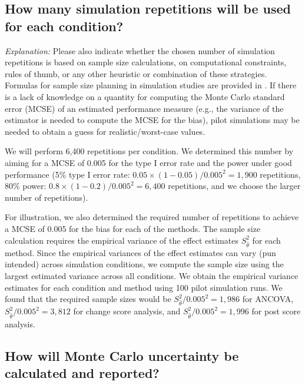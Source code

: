 \documentclass[12pt]{article}
\begin{document}
\subsection{How many simulation repetitions will be used for each condition?}

\textit{Explanation:} Please also indicate whether the chosen number of simulation repetitions is based on sample size calculations, on computational constraints, rules of thumb, or any other heuristic or combination of these strategies. Formulas for sample size planning in simulation studies are provided in \textcite{Siepe2023}. If there is a lack of knowledge on a quantity for computing the Monte Carlo standard error (MCSE) of an estimated performance measure (e.g., the variance of the estimator is needed to compute the MCSE for the bias), pilot simulations may be needed to obtain a guess for realistic/worst-case values.

\begin{examplebox}
We will perform 6,400 repetitions per condition. We determined this number by aiming for a MCSE of 0.005 for the type I error rate and the power under good performance (5\% type I error rate: $0.05 \times (1 - 0.05) / 0.005^2 = 1,900$ repetitions, 80\% power: $0.8 \times (1 - 0.2) / 0.005^2 = 6,400$ repetitions, and we choose the larger number of repetitions).

For illustration, we also determined the required number of repetitions to achieve a MCSE of 0.005 for the bias for each of the methods. The sample size calculation requires the empirical variance of the effect estimates $S_{\hat{\theta}}^2$ for each method. Since the empirical variances of the effect estimates can vary (pun intended) across simulation conditions, we compute the sample size using the largest estimated variance across all conditions. We obtain the empirical variance estimates for each condition and method using 100 pilot simulation runs. We found that the required sample sizes would be $S_{\hat{\theta}}^2/0.005^2 = 1{,}986$ for ANCOVA, $S_{\hat{\theta}}^2/0.005^2 = 3{,}812$ for change score analysis, and $S_{\hat{\theta}}^2/0.005^2 = 1{,}996$ for post score analysis.
\end{examplebox}


\subsection{How will Monte Carlo uncertainty be calculated and reported?}
\end{document}
